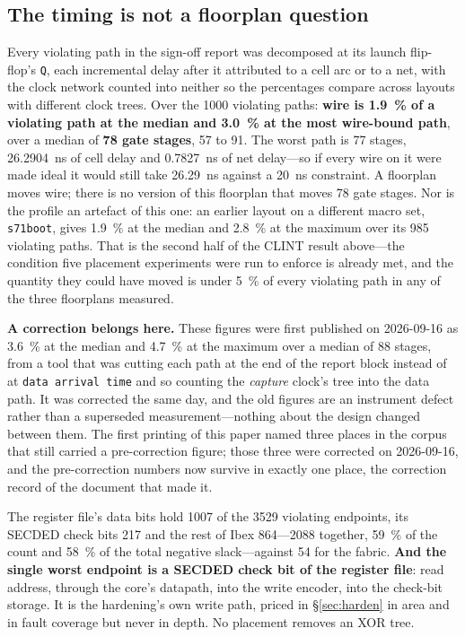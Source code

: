 \documentclass[11pt,a4paper]{article}
\newcommand{\file}[1]{\texttt{\small #1}}
\begin{document}
\subsection{The timing is not a floorplan question}
\label{sec:settle-fp}

Every violating path in the sign-off report was decomposed at its
launch flip-flop's \texttt{Q}, each incremental delay after it
attributed to a cell arc or to a net, with the clock network counted
into neither so the percentages compare across layouts with different
clock trees. Over the \num{1000} violating paths: \textbf{wire is
\SI{1.9}{\percent} of a violating path at the median and
\SI{3.0}{\percent} at the most wire-bound path}, over a median of
\textbf{\num{78} gate stages}, \num{57} to \num{91}. The worst path is
\num{77} stages, \SI{26.2904}{\nano\second} of cell delay and
\SI{0.7827}{\nano\second} of net delay---so if every wire on it were
made ideal it would still take \SI{26.29}{\nano\second} against a
\SI{20}{\nano\second} constraint. A floorplan moves wire; there is no
version of this floorplan that moves \num{78} gate stages. Nor is the
profile an artefact of this one: an earlier layout on a different macro
set, \file{s71boot}, gives \SI{1.9}{\percent} at the median and
\SI{2.8}{\percent} at the maximum over its \num{985} violating
paths. That is the second half of the CLINT result above---the
condition five placement experiments were run to enforce is already
met, and the quantity they could have moved is under \SI{5}{\percent}
of every violating path in any of the three floorplans measured.

\textbf{A correction belongs here.} These figures were first published
on 2026-09-16 as \SI{3.6}{\percent} at the median and
\SI{4.7}{\percent} at the maximum over a median of \num{88} stages,
from a tool that was cutting each path at the end of the report block
instead of at \texttt{data arrival time} and so counting the
\emph{capture} clock's tree into the data path. It was corrected the
same day, and the old figures are an instrument defect rather than a
superseded measurement---nothing about the design changed between them.
The first printing of this paper named three places in the corpus that
still carried a pre-correction figure; those three were corrected on
2026-09-16, and the pre-correction numbers now survive in exactly one
place, the correction record of the document that made it.

The register file's data bits hold \num{1007} of the \num{3529}
violating endpoints, its SECDED check bits \num{217} and the rest of
Ibex \num{864}---\num{2088} together, \SI{59}{\percent} of the count
and \SI{58}{\percent} of the total negative slack---against \num{54}
for the fabric. \textbf{And the
single worst endpoint is a SECDED check bit of the register file}: read
address, through the core's datapath, into the write encoder, into the
check-bit storage. It is the hardening's own write path, priced in
\S\ref{sec:harden} in area and in fault coverage but never in depth. No
placement removes an XOR tree.
\end{document}
